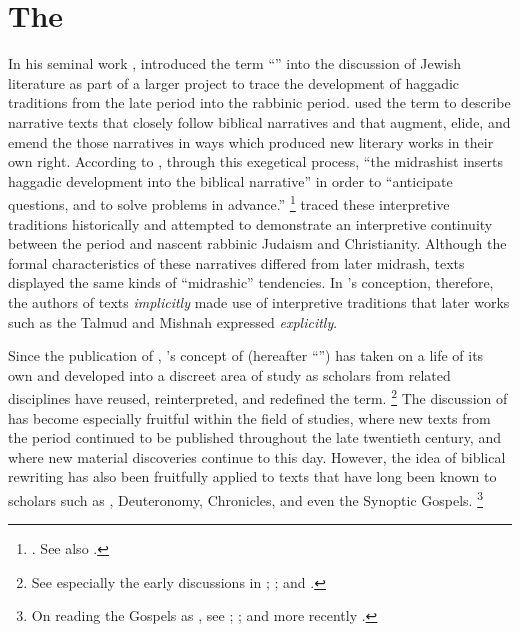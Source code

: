 
\chapter{The \rwb}
\label{chap:rwb}

In his seminal work , \Vermes introduced the term ``\rwB'' into the discussion of \secondtemple Jewish literature as part of a larger project to trace the development of haggadic traditions from the late \secondtemple period into the rabbinic period. \vermes used the term \rwB to describe narrative texts that closely follow biblical narratives and that augment, elide, and emend the those narratives in ways which produced new literary works in their own right. According to \vermes, through this exegetical process, ``the midrashist inserts haggadic development into the biblical narrative'' in order to ``anticipate questions, and to solve problems in advance.''%
    \footnote{%
        \Cite[95]{vermes1961}. See also
        \cite{vermes_zsengeller2014}.}
\vermes traced these interpretive traditions historically and attempted to demonstrate an interpretive continuity between the \secondtemple period and nascent rabbinic Judaism and Christianity. Although the formal characteristics of these narratives differed from later midrash, \rwB texts displayed the same kinds of ``midrashic'' tendencies. In \vermes's conception, therefore, the authors of \rwB texts \emph{implicitly} made use of interpretive traditions that later works such as the Talmud and Mishnah expressed \emph{explicitly}. 

Since the publication of , \vermes's concept of \rwB (hereafter ``\rwb'') has taken on a life of its own and developed into a discreet area of study as scholars from related disciplines have reused, reinterpreted, and redefined the term.%
    \footnote{%
        See especially the early discussions in 
        \cite{alexander_carson-williamson1988}; 
        \cite{nickelsburg_stone1984}; and \cite{harrington_kraft-nickelsburg1986}.}
The discussion of \rwb has become especially fruitful within the field of \qumran studies, where new texts from the \secondtemple period continued to be published throughout the late twentieth century, and where new material discoveries continue to this day. However, the idea of biblical rewriting has also been fruitfully applied to texts that have long been known to scholars such as \jub, Deuteronomy, Chronicles, and even the Synoptic Gospels.%
    \footnote{%
        On reading the Gospels as \rwb, see 
        \cite{müller_back-kankaanniemi2012}; 
        \cite{malan_hts2014}; and more recently 
        \cite{allen_jsnt2018}.}

